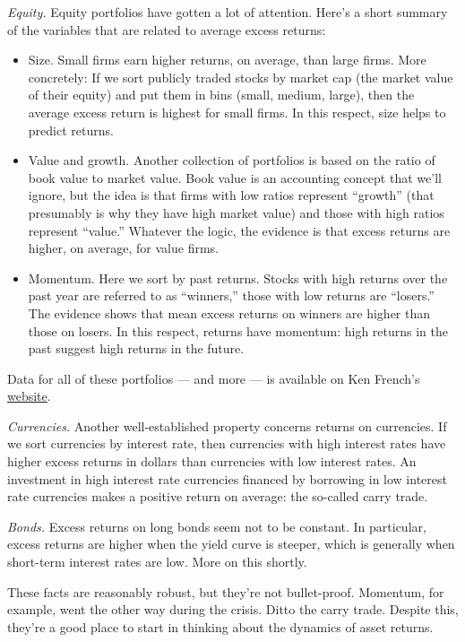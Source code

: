 \documentclass[11pt]{article}
\begin{document}
{\it Equity.\/}
Equity portfolios have gotten a lot of attention.
Here's a short summary of the variables that are related to average excess returns:
%
\begin{itemize}
\item Size.  Small firms earn higher returns, on average, than large firms.
More concretely:  If we sort publicly traded stocks by market cap (the market value of their equity)
and put them in bins (small, medium, large), then
the average excess return is highest for small firms.
In this respect, size helps to predict returns.

\item Value and growth.
Another collection of portfolios is based on the ratio of book value to market value.
Book value is an accounting concept that we'll ignore, but the idea is that
firms with low ratios represent ``growth'' (that presumably is why they have high market value)
and those with high ratios represent ``value.''
Whatever the logic, the evidence is that excess returns are higher, on average,
for value firms.

\item Momentum.  Here we sort by past returns.
Stocks with high returns over the past year are referred to as ``winners,''
those with low returns are ``losers.''
The evidence shows that mean excess returns on winners are higher than those
on losers.
In this respect, returns have momentum:  high returns in the past suggest high returns
in the future.

\end{itemize}
%
Data for all of these portfolios --- and more ---
is available on Ken French's
\href{http://mba.tuck.dartmouth.edu/pages/faculty/ken.french/data_library.html}{website}.


{\it Currencies.\/}
Another well-established property concerns returns on currencies.
If we sort currencies by interest rate, then currencies with high interest rates
have higher excess returns in dollars than currencies with low interest rates.
An investment in high interest rate currencies financed by borrowing in low interest rate
currencies makes a positive return on average:  the so-called carry trade.

{\it Bonds.\/}
Excess returns on long bonds seem not to be constant.
In particular, excess returns are higher when the yield curve is steeper,
which is generally when short-term interest rates are low.
More on this shortly.

These facts are reasonably robust, but they're not bullet-proof.
Momentum, for example, went the other way during the crisis.
Ditto the carry trade.
Despite this, they're a good place to start in thinking
about the dynamics of asset returns.
\end{document}
